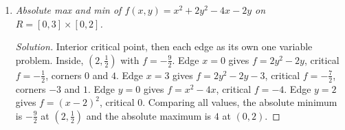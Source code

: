 \documentclass[12pt]{article}
\newenvironment{solution}
  {\renewcommand\qedsymbol{$\blacksquare$}\begin{proof}[Solution]}
  {\end{proof}}
\newcounter{topic}
\begin{document}
\begin{enumerate}
\begin{enumerate}
    \item \textit{Absolute max and min of $f(x,y)=x^2+2y^2-4x-2y$ on $R=[0,3]\times[0,2]$.}

    \begin{solution}
    Interior critical point, then each edge as its own one variable problem. Inside, $(2,\tfrac12)$ with $f=-\tfrac92$. Edge $x=0$ gives $f=2y^2-2y$, critical $f=-\tfrac12$, corners $0$ and $4$. Edge $x=3$ gives $f=2y^2-2y-3$, critical $f=-\tfrac72$, corners $-3$ and $1$. Edge $y=0$ gives $f=x^2-4x$, critical $f=-4$. Edge $y=2$ gives $f=(x-2)^2$, critical $0$. Comparing all values, the absolute minimum is $-\tfrac92$ at $(2,\tfrac12)$ and the absolute maximum is $4$ at $(0,2)$.
    \end{solution}

    \end{enumerate}
\newpage
\setcounter{topic}{\value{enumi}}
\end{enumerate}
\end{document}
